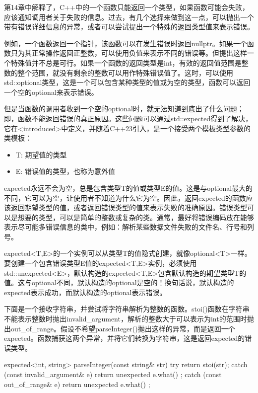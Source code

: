 
第14章中解释了，C++中的一个函数只能返回一个类型，如果函数可能会失败，应该通知调用者关于失败的信息。过去，有几个选择来做到这一点，可以抛出一个带有错误详细信息的异常，或者可以尝试提出一个特殊的返回类型值来表示错误。

例如，一个函数返回一个指针，该函数可以在发生错误时返回nullptr。如果一个函数只为其正常操作返回正整数，可以使用负值来表示不同的错误等。但提出这样一个特殊值并不总是可行。如果一个函数的返回类型是int，有效的返回值范围是整数的整个范围，就没有剩余的整数可以用作特殊错误值了。这时，可以使用std::optional类型，这是一个可以包含某种类型的值或为空的类型，函数可以返回一个空的optional来表示错误。

但是当函数的调用者收到一个空的optional时，就无法知道到底出了什么问题；即，函数不能返回错误的真正原因。这些问题可以通过std::expected得到了解决，它在<introduced>中定义，并随着C++23引入，是一个接受两个模板类型参数的类模板：

\begin{itemize}
\item
T: 期望值的类型

\item
E: 错误值的类型，也称为意外值
\end{itemize}

expected永远不会为空，总是包含类型T的值或类型E的值。这是与optional最大的不同，它可以为空，让使用者不知道为什么它为空。因此，返回expected的函数应该返回期望类型的值，或者返回错误类型的值来表示失败的准确原因。错误类型可以是想要的类型，可以是简单的整数或复杂的类。通常，最好将错误编码放在能够表示尽可能多错误信息的类中，例如：解析某些数据文件失败的文件名、行号和列号。

expected<T,E>的一个实例可以从类型T的值隐式创建，就像optional<T>一样。要创建一个包含错误类型E值的expected<T,E>实例，必须使用std::unexpected<E>，默认构造的expected<T,E>包含默认构造的期望类型T的值。这与optional不同，默认构造的optional是空的！换句话说，默认构造的expected表示成功，而默认构造的optional表示错误。

下面是一个接收字符串，并尝试将字符串解析为整数的函数。stoi()函数在字符串不能表示整数时抛出invalid\_argument，解析的整数大于可以表示为int的范围时抛出out\_of\_range。假设不希望parseInteger()抛出这样的异常，而是返回一个expected。函数捕获这两个异常，并将它们转换为字符串，这是返回expected的错误类型。

\begin{cpp}
expected<int, string> parseInteger(const string& str)
{
    try { return stoi(str); }
    catch (const invalid_argument& e) { return unexpected { e.what() }; }
    catch (const out_of_range& e) { return unexpected { e.what() }; }
}
\end{cpp}

